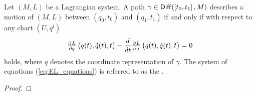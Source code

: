 \begin{theorem}
	\label{thm:EL_equations}
	Let $(M,L)$ be a Lagrangian system. A path $\gamma \in \mathsf{Diff}(\intcc[0]{t_0,t_1},M)$ describes a motion of $(M,L)$ between $(q_0,t_0)$ and $(q_1,t_1)$ if and only if with respect to any chart $(U,q^i)$
	\begin{equation}
		\label{eq:EL_equations}
		\pd{L}{q}\del[1]{q(t),\dot{q}(t),t} - \frac{d}{dt} \pd{L}{\dot{q}}\del[1]{q(t),\dot{q}(t),t} = 0
	\end{equation}
	\noindent holds, where $q$ denotes the coordinate representation of $\gamma$. The system of equations \textup{(}\ref{eq:EL_equations}\textup{)} is referred to as the .
\end{theorem}

\begin{proof}
		
\end{proof}
